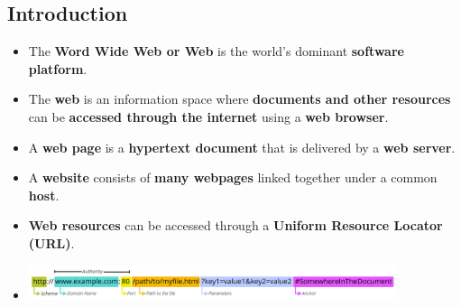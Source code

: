 \documentclass{article}
\begin{document}
    \subsection*{Introduction}
    \begin{itemize}
        \item The \textbf{Word Wide Web or Web} is the world's dominant \textbf{software platform}.
        \item The \textbf{web} is an information space where \textbf{documents and other resources} can be \textbf{accessed through the internet} using a \textbf{web browser}.
        \item A \textbf{web page} is a \textbf{hypertext document} that is delivered by a \textbf{web server}.
        \item A \textbf{website} consists of \textbf{many webpages} linked together under a common \textbf{host}.
        \item \textbf{Web resources} can be accessed through a \textbf{Uniform Resource Locator (URL)}.
        \item[] \includegraphics[width=407px]{images/URL.png}
    \end{itemize}
    
\end{document}
